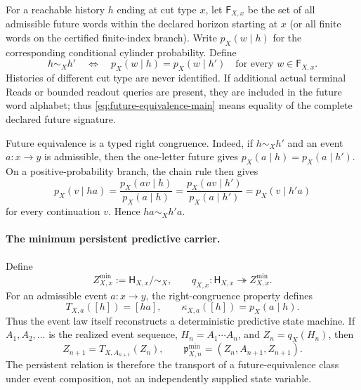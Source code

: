 \documentclass[11pt]{article}
\numberwithin{equation}{section}
\theoremstyle{definition}
\theoremstyle{remark}
\begin{document}
For a reachable history $h$ ending at cut type $x$, let $\mathsf F_{X,x}$ be
the set of all admissible future words within the declared horizon
starting at $x$ (or all finite words on the certified finite-index branch).  Write
$p_X(w\mid h)$ for the corresponding conditional cylinder probability.  Define
\begin{equation}
 h\sim_X h'
 \quad\Longleftrightarrow\quad
 p_X(w\mid h)=p_X(w\mid h')
 \quad\text{for every }w\in\mathsf F_{X,x}.
 \label{eq:future-equivalence-main}
\end{equation}
Histories of different cut type are never identified.  If additional actual
terminal Reads or bounded readout queries are present, they are included in
the future word alphabet; thus \eqref{eq:future-equivalence-main} means equality
of the complete declared future signature.

Future equivalence is a typed right congruence.  Indeed, if $h\sim_Xh'$ and an
event $a:x\to y$ is admissible, then the one-letter future gives
$p_X(a\mid h)=p_X(a\mid h')$.  On a positive-probability branch, the chain rule
then gives
\[
 p_X(v\mid ha)
 =\frac{p_X(av\mid h)}{p_X(a\mid h)}
 =\frac{p_X(av\mid h')}{p_X(a\mid h')}
 =p_X(v\mid h'a)
\]
for every continuation $v$.  Hence $ha\sim_Xh'a$.

\paragraph{The minimum persistent predictive carrier.}

Define
\begin{equation}
 Z_{X,x}^{\min}:=\mathsf H_{X,x}/\!\sim_X,
 \qquad q_{X,x}:\mathsf H_{X,x}\twoheadrightarrow Z_{X,x}^{\min}.
 \label{eq:predictive-state-main}
\end{equation}
For an admissible event $a:x\to y$, the right-congruence property defines
\begin{equation}
 T_{X,a}([h])=[ha],
 \qquad
 \kappa_{X,a}([h])=p_X(a\mid h).
 \label{eq:predictive-update-main}
\end{equation}
Thus the event law itself reconstructs a deterministic predictive state
machine.  If $A_1,A_2,\ldots$ is the realized event sequence,
$H_n=A_1\cdots A_n$, and $Z_n=q_X(H_n)$, then
\begin{equation}
 Z_{n+1}=T_{X,A_{n+1}}(Z_n),
 \qquad
 \mathfrak p_{X,n}^{\min}
   =(Z_n,A_{n+1},Z_{n+1}).
 \label{eq:derived-relation-packet-main}
\end{equation}
The persistent relation is therefore the transport of a future-equivalence
class under event composition, not an independently supplied state variable.
\end{document}
